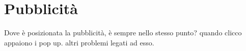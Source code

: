 \section{Pubblicità}
Dove è posizionata la pubblicità, è sempre nello stesso punto? quando clicco appaiono i pop up. altri problemi legati ad esso.